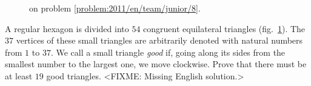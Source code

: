 \ifproblem
\begin{figure}\centering
    \caption{on problem \ref{problem:2011/en/team/junior/8}.}
    \label{fig:problem:2011/en/team/junior/8}
\end{figure}
\fi %

\problem{}
\label{problem:2011/en/team/junior/8}%
A regular hexagon is divided into $54$ congruent equilateral triangles
(fig.~\ref{fig:problem:2011/en/team/junior/8}).
The $37$ vertices of these small triangles are arbitrarily denoted with natural
numbers from $1$ to $37$.
We call a small triangle \emph{good} if, going along its sides from the
smallest number to the largest one, we move clockwise.
Prove that there must be at least $19$ good triangles.
\solution
<FIXME: Missing English solution.>
\endproblem
